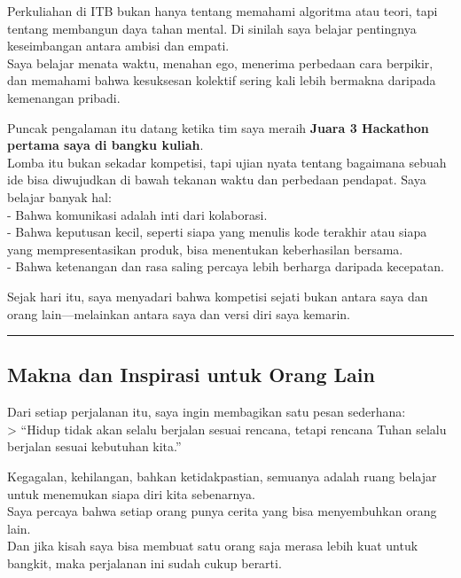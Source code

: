 \documentclass[
  letterpaper,
  DIV=11,
  numbers=noendperiod]{scrreprt}
\begin{document}
Perkuliahan di ITB bukan hanya tentang memahami algoritma atau teori,
tapi tentang membangun daya tahan mental. Di sinilah saya belajar
pentingnya keseimbangan antara ambisi dan empati.\\
Saya belajar menata waktu, menahan ego, menerima perbedaan cara
berpikir, dan memahami bahwa kesuksesan kolektif sering kali lebih
bermakna daripada kemenangan pribadi.

Puncak pengalaman itu datang ketika tim saya meraih \textbf{Juara 3
Hackathon pertama saya di bangku kuliah}.\\
Lomba itu bukan sekadar kompetisi, tapi ujian nyata tentang bagaimana
sebuah ide bisa diwujudkan di bawah tekanan waktu dan perbedaan
pendapat. Saya belajar banyak hal:\\
- Bahwa komunikasi adalah inti dari kolaborasi.\\
- Bahwa keputusan kecil, seperti siapa yang menulis kode terakhir atau
siapa yang mempresentasikan produk, bisa menentukan keberhasilan
bersama.\\
- Bahwa ketenangan dan rasa saling percaya lebih berharga daripada
kecepatan.

Sejak hari itu, saya menyadari bahwa kompetisi sejati bukan antara saya
dan orang lain---melainkan antara saya dan versi diri saya kemarin.

\begin{center}\rule{0.5\linewidth}{0.5pt}\end{center}

\subsection{\texorpdfstring{\textbf{Makna dan Inspirasi untuk Orang
Lain}}{Makna dan Inspirasi untuk Orang Lain}}\label{makna-dan-inspirasi-untuk-orang-lain}

Dari setiap perjalanan itu, saya ingin membagikan satu pesan
sederhana:\\
\textgreater{} ``Hidup tidak akan selalu berjalan sesuai rencana, tetapi
rencana Tuhan selalu berjalan sesuai kebutuhan kita.''

Kegagalan, kehilangan, bahkan ketidakpastian, semuanya adalah ruang
belajar untuk menemukan siapa diri kita sebenarnya.\\
Saya percaya bahwa setiap orang punya cerita yang bisa menyembuhkan
orang lain.\\
Dan jika kisah saya bisa membuat satu orang saja merasa lebih kuat untuk
bangkit, maka perjalanan ini sudah cukup berarti.
\end{document}
